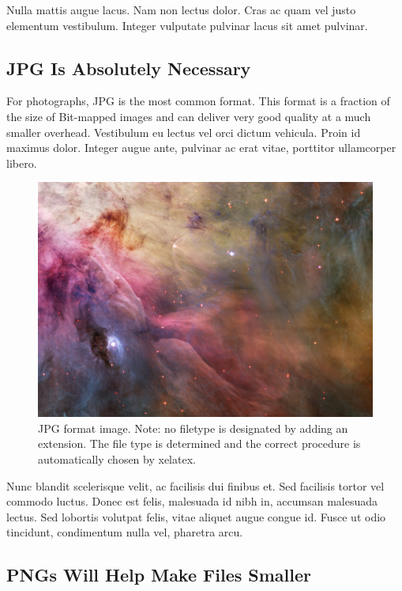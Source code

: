 Nulla mattis augue lacus. Nam non lectus dolor. Cras ac quam vel justo elementum vestibulum. Integer vulputate pulvinar lacus sit amet pulvinar.

\subsection{JPG Is Absolutely Necessary}

For photographs, JPG is the most common format. This format is a fraction of the size of Bit-mapped images and can deliver very good quality at a much smaller overhead. Vestibulum eu lectus vel orci dictum vehicula. Proin id maximus dolor. Integer augue ante, pulvinar ac erat vitae, porttitor ullamcorper libero. \cite{l2012wrinkle}

\begin{figure}[htbp]
  \centering
    \includegraphics[width=5in]{images/nebula}
    \caption[JPG format image. Note: no filetype is designated by adding an extension.]{JPG format image. Note: no filetype is designated by adding an extension. The file type is determined and the correct procedure is automatically chosen by xelatex.}
\end{figure}

Nunc blandit scelerisque velit, ac facilisis dui finibus et. Sed facilisis tortor vel commodo luctus. Donec est felis, malesuada id nibh in, accumsan malesuada lectus. Sed lobortis volutpat felis, vitae aliquet augue congue id. Fusce ut odio tincidunt, condimentum nulla vel, pharetra arcu.

\subsection{PNGs Will Help Make Files Smaller}


